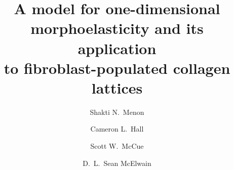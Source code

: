 


\title{A model for one-dimensional morphoelasticity and its application \\
to fibroblast-populated collagen lattices%
}


\author{Shakti N.~Menon \and
        Cameron L.~Hall \and
        Scott W.~McCue \and
        D.~L.~Sean McElwain}



